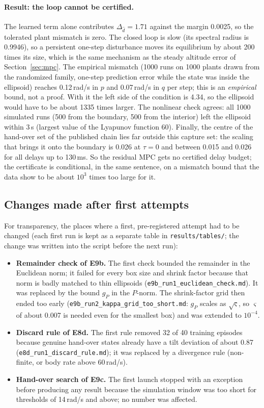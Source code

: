 \paragraph{Result: the loop cannot be certified.} The learned term alone contributes $\Delta_{\hat d}=1.71$ against the margin 0.0025, so the tolerated plant mismatch is zero. The closed loop is slow (its spectral radius is 0.9946), so a persistent one-step disturbance moves its equilibrium by about 200 times its size, which is the same mechanism as the steady altitude error of Section~\ref{sec:mpc}. The empirical mismatch (1000 runs on 1000 plants drawn from the randomized family, one-step prediction error while the state was inside the ellipsoid) reaches 0.12\,rad/s in $p$ and 0.07\,rad/s in $q$ per step; this is an \emph{empirical} bound, not a proof. With it the left side of the condition is 4.34, so the ellipsoid would have to be about 1335 times larger. The nonlinear check agrees: all 1000 simulated runs (500 from the boundary, 500 from the interior) left the ellipsoid within 3\,s (largest value of the Lyapunov function 60). Finally, the centre of the hand-over set of the published chain lies far outside this capture set: the scaling that brings it onto the boundary is 0.026 at $\tau=0$ and between 0.015 and 0.026 for all delays up to 130\,ms. So the residual MPC gets no certified delay budget; the certificate is conditional, in the same sentence, on a mismatch bound that the data show to be about $10^{3}$ times too large for it.

\subsection{Changes made after first attempts}\label{sec:budget-dev}
For transparency, the places where a first, pre-registered attempt had to be changed (each first run is kept as a separate table in \texttt{results/tables/}; the change was written into the script before the next run):
\begin{itemize}
  \item \textbf{Remainder check of E9b.} The first check bounded the remainder in the Euclidean norm; it failed for every box size and shrink factor because that norm is badly matched to thin ellipsoids (\texttt{e9b\_run1\_euclidean\_check.md}). It was replaced by the bound $g_P$ in the $P$-norm. The shrink-factor grid then ended too early (\texttt{e9b\_run2\_kappa\_grid\_too\_short.md}: $g_P$ scales as $\sqrt{\varsigma}$, so $\varsigma$ of about 0.007 is needed even for the smallest box) and was extended to $10^{-4}$.
  \item \textbf{Discard rule of E8d.} The first rule removed 32 of 40 training episodes because genuine hand-over states already have a tilt deviation of about 0.87 (\texttt{e8d\_run1\_discard\_rule.md}); it was replaced by a divergence rule (non-finite, or body rate above 60\,rad/s).
  \item \textbf{Hand-over search of E9c.} The first launch stopped with an exception before producing any result because the simulation window was too short for thresholds of 14\,rad/s and above; no number was affected.
\end{itemize}
